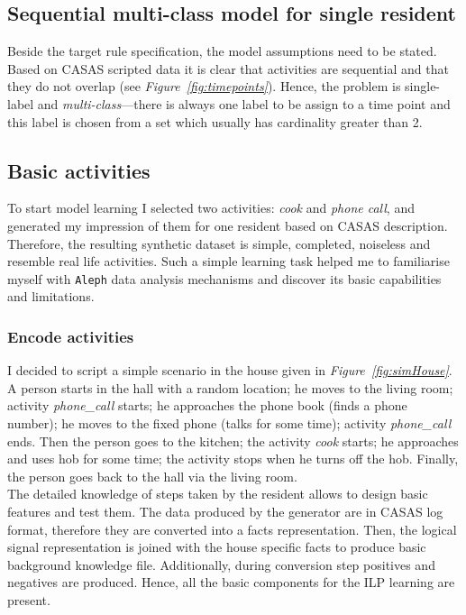 \documentclass[10pt, a4paper, pdflatex, leqno, twoside, openright]{report}
\begin{document}
    \subsection{Sequential multi-class model for single resident\label{ch:smcm}}
Beside the target rule specification, the model assumptions need to be stated. Based on CASAS scripted data it is clear that activities are sequential and that they do not overlap (see \emph{Figure~\ref{fig:timepoints}}). Hence, the problem is single-label and \emph{multi-class}---there is always one label to be assign to a time point and this label is chosen from a set which usually has cardinality greater than 2.

    \subsection{Basic activities\label{sec:basicActibities}}
To start model learning I selected two activities: \emph{cook} and \emph{phone call}, and generated my impression of them for one resident based on CASAS description. Therefore, the resulting synthetic dataset is simple, completed, noiseless and resemble real life activities. Such a simple learning task helped me to familiarise myself with \texttt{Aleph} data analysis mechanisms and discover its basic capabilities and limitations.

      \subsubsection{Encode activities}
I decided to script a simple scenario in the house given in \emph{Figure~\ref{fig:simHouse}}. A person starts in the hall with a random location; he moves to the living room; activity \emph{phone\_call} starts; he approaches the phone book (finds a phone number); he moves to the fixed phone (talks for some time); activity \emph{phone\_call} ends. Then the person goes to the kitchen; the activity \emph{cook} starts; he approaches and uses hob for some time; the activity stops when he turns off the hob. Finally, the person goes back to the hall via the living room.\\

The detailed knowledge of steps taken by the resident allows to design basic features and test them. The data produced by the generator are in CASAS log format, therefore they are converted into a facts representation. Then, the logical signal representation is joined with the house specific facts to produce basic background knowledge file. Additionally, during conversion step positives and negatives are produced. Hence, all the basic components for the ILP learning are present.
\end{document}
